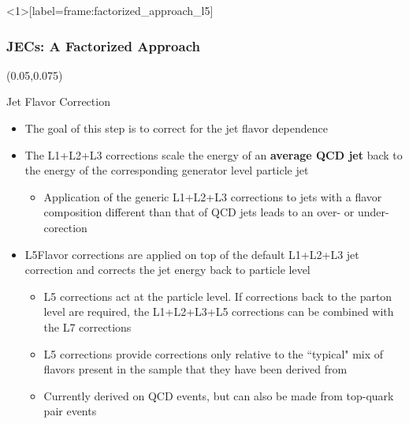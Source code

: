 \begin{frame}<1>[label=frame:factorized_approach_l5]
	\frametitle{JECs: A Factorized Approach}
        \begin{textblock}{.9}(0.05,0.075)
		\begin{figure}
			\label{fig:factorized_approach_l5}
		\end{figure}
	\end{textblock}
	\vspace*{2.2cm}
	\begin{block}{Jet Flavor Correction}
		\begin{itemize}
		\footnotesize
		\item The goal of this step is to correct for the jet flavor dependence
		\item The L1+L2+L3 corrections scale the energy of an \textbf{average QCD jet} back to the energy of the corresponding generator level particle jet
		\begin{itemize}
			\footnotesize
			\item Application of the generic L1+L2+L3 corrections to jets with a flavor composition different than that of QCD jets leads to an over- or under-corection
		\end{itemize}
		\item L5Flavor corrections are applied on top of the default L1+L2+L3 jet correction and corrects the jet energy back to particle level
			\begin{itemize}
				\footnotesize
				\item L5 corrections act at the particle level. If corrections back to the parton level are required, the L1+L2+L3+L5 corrections can be combined with the L7 corrections
				\item L5 corrections provide corrections only relative to the ``typical" mix of flavors present in the sample that they have been derived from
				\item Currently derived on QCD events, but can also be made from top-quark pair events
			\end{itemize}
		\end{itemize}

\end{block}
\end{frame}
